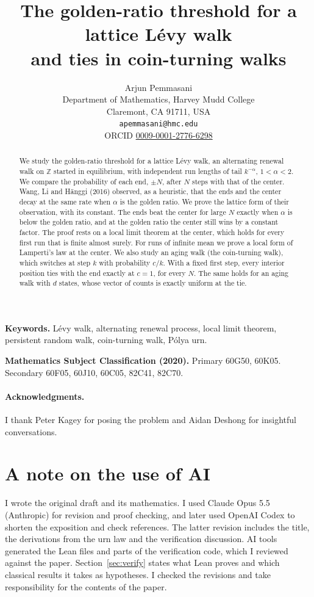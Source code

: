 \documentclass[11pt]{article}
\title{The golden-ratio threshold for a lattice L\'evy walk\\ and ties in coin-turning walks}
\author{Arjun Pemmasani\\[2pt]
\small Department of Mathematics, Harvey Mudd College\\
\small Claremont, CA 91711, USA\\
\small \texttt{apemmasani@hmc.edu}\\
\small ORCID \href{https://orcid.org/0009-0001-2776-6298}{0009-0001-2776-6298}}
\date{}
\theoremstyle{definition}
\theoremstyle{remark}
\newcommand{\Z}{\mathbb{Z}}
\begin{document}
\maketitle

\begin{abstract}
We study the golden-ratio threshold for a lattice L\'evy walk, an alternating
renewal walk on $\Z$ started in equilibrium, with independent run lengths of
tail $k^{-\alpha}$, $1<\alpha<2$. We
compare the probability of each end, $\pm N$, after $N$ steps with that of
the center. Wang, Li and H\"anggi (2016) observed, as a heuristic, that the
ends and the center decay at the same rate when $\alpha$
is the golden ratio. We prove the lattice form of their observation, with its
constant. The ends beat the center for large $N$ exactly when $\alpha$
is below the golden ratio, and at the golden ratio the center still wins by a
constant factor. The proof rests on a local limit theorem at the center, which
holds for every first run that is finite almost surely. For runs of infinite
mean we prove a local form of Lamperti's law at the center. We also study an aging walk (the coin-turning walk), which switches at step
$k$ with probability $c/k$. With a fixed first step, every interior position ties with
the end exactly at $c=1$, for every $N$. The same holds for an aging walk with
$d$ states, whose vector of counts is exactly uniform at the tie.
\end{abstract}

\medskip
\noindent\textbf{Keywords.} L\'evy walk, alternating renewal process, local
limit theorem, persistent random walk, coin-turning walk, P\'olya urn.

\noindent\textbf{Mathematics Subject Classification (2020).} Primary 60G50,
60K05. Secondary 60F05, 60J10, 60C05, 82C41, 82C70.






\paragraph{Acknowledgments.} I thank Peter Kagey for posing the problem and
Aidan Deshong for insightful conversations.

\section*{A note on the use of AI}
I wrote the original draft and its mathematics. I used Claude Opus 5.5
(Anthropic) for revision and proof checking, and later used OpenAI Codex to
shorten the exposition and check references. The latter revision includes
the title, the derivations from the urn law and the verification discussion.
AI tools generated the Lean files and parts of the verification code, which
I reviewed against the paper. Section~\ref{sec:verify} states what Lean
proves and which classical results it takes as hypotheses. I checked the
revisions and take responsibility for the contents of the paper.
\end{document}
